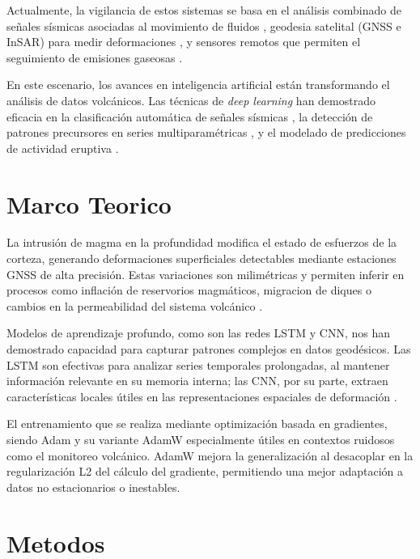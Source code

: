 \documentclass[11pt, a4paper, twocolumn]{article}  %
\begin{document}
Actualmente, la vigilancia de estos sistemas se basa en el análisis combinado de señales sísmicas asociadas al movimiento de fluidos \citep{chouet2022seismic}, geodesia satelital (GNSS e InSAR) para medir deformaciones \citep{pritchard2022satellite}, y sensores remotos que permiten el seguimiento de emisiones gaseosas \citep{carn2023gas}.

En este escenario, los avances en inteligencia artificial están transformando el análisis de datos volcánicos. Las técnicas de \textit{deep learning} han demostrado eficacia en la clasificación automática de señales sísmicas \citep{beyreuther2020machine}, la detección de patrones precursores en series multiparamétricas \citep{corbi2021machine}, y el modelado de predicciones de actividad eruptiva \citep{bosman2023forecasting}.



\section{Marco Teorico}

La intrusión de magma en la profundidad modifica el estado de esfuerzos de la corteza, generando deformaciones superficiales detectables mediante estaciones GNSS de alta precisión. Estas variaciones son milimétricas y permiten inferir en procesos como inflación de reservorios magmáticos, migracion de diques o cambios en la permeabilidad del sistema volcánico \cite{pinel2014volcanic}.

Modelos de aprendizaje profundo, como son las redes LSTM y CNN, nos han demostrado capacidad para capturar patrones complejos en datos geodésicos. Las LSTM son efectivas para analizar series temporales prolongadas, al mantener información relevante en su memoria interna; las CNN, por su parte, extraen características locales útiles en las representaciones espaciales de deformación \cite{leek2021deep}.

El entrenamiento que se realiza mediante optimización basada en gradientes, siendo Adam y su variante AdamW especialmente útiles en contextos ruidosos como el monitoreo volcánico. AdamW mejora la generalización al desacoplar en la regularización L2 del cálculo del gradiente, permitiendo una mejor adaptación a datos no estacionarios o inestables.



\section{Metodos}
\end{document}
